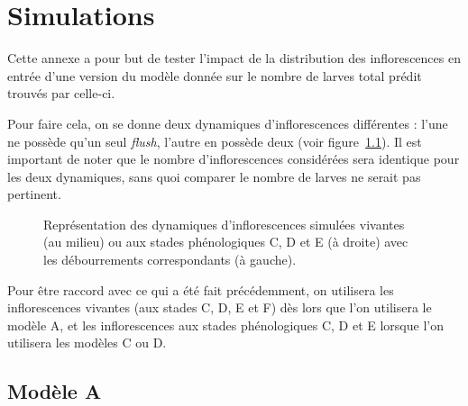 \chapter{Simulations} 

Cette annexe a pour but de tester l'impact de la distribution des inflorescences en entrée d'une version du modèle donnée sur le nombre de larves total prédit trouvés par celle-ci.

Pour faire cela, on se donne deux dynamiques d'inflorescences différentes : l'une ne possède qu'un seul \textit{flush}, l'autre en possède deux (voir figure~\ref{fig:flush}). 
Il est important de noter que le nombre d'inflorescences considérées sera identique pour les deux dynamiques, sans quoi comparer le nombre de larves ne serait pas pertinent.

\begin{figure}[h]
 \centering
 \caption{Représentation des dynamiques d'inflorescences simulées vivantes (au milieu) ou aux stades phénologiques C, D et E (à droite) avec les débourrements correspondants (à gauche). }
 \label{fig:flush}
\end{figure}

Pour être raccord avec ce qui a été fait précédemment, on utilisera les inflorescences vivantes (aux stades C, D, E et F) dès lors que l'on utilisera le modèle A, et les inflorescences aux stades phénologiques C, D et E lorsque l'on utilisera les modèles C ou D.

\section{Modèle A}

